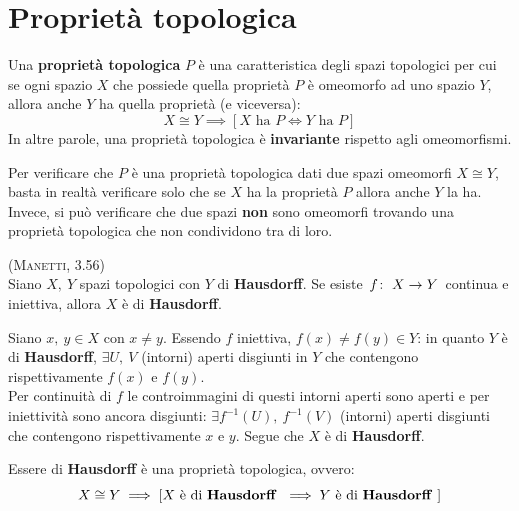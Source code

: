 \section{Proprietà topologica}
\begin{define}
	Una \textbf{proprietà topologica} $P$ è una caratteristica degli spazi topologici per cui se ogni spazio $X$ che possiede quella proprietà $P$ è omeomorfo ad uno spazio $Y$, allora anche $Y$ ha quella proprietà (e viceversa):
	\begin{equation}
		X\cong Y\implies \left[ X\text{ ha }P\iff Y\text{ ha }P\right]
	\end{equation}
	In altre parole, una proprietà topologica è \textbf{invariante} rispetto agli omeomorfismi.
\end{define}
\begin{observe}
	Per verificare che $P$ è una proprietà topologica dati due spazi omeomorfi $X\cong Y$, basta in realtà verificare solo che se $X$ ha la proprietà $P$ allora anche $Y$ la ha.\\
	Invece, si può verificare che due spazi \textbf{non} sono omeomorfi trovando una proprietà topologica che non condividono tra di loro.
\end{observe}
\begin{exercise}\label{hausexercise}\textsc{(Manetti, 3.56)}\\
	Siano $X,\ Y$ spazi topologici con $Y$ di \textbf{Hausdorff}. Se esiste $\funz{f}{X}{Y}$ continua e iniettiva, allora $X$ è di \textbf{Hausdorff}.
\end{exercise}
\begin{demonstration}
	Siano $x,\ y\in X$ con $x\neq y$. Essendo $f$ iniettiva, $f\left(x\right)\neq f\left(y\right)\in Y$: in quanto $Y$ è di \textbf{Hausdorff}, $\exists U,\ V$ (intorni) aperti disgiunti in $Y$ che contengono rispettivamente $f\left(x\right)$ e $f\left(y\right)$.\\
	Per continuità di $f$ le controimmagini di questi intorni aperti sono aperti e per iniettività sono ancora disgiunti: $\exists f^{-1}\left(U\right),\ f^{-1}\left(V\right)$ (intorni) aperti disgiunti che contengono rispettivamente $x$ e $y$. Segue che $X$ è di \textbf{Hausdorff}.
\end{demonstration}
\begin{proposition}
	Essere di \textbf{Hausdorff} è una proprietà topologica, ovvero:
	\begin{equation}
		X\cong Y\implies \left[ X\text{ è di \textbf{Hausdorff} }\implies Y\text{ è di \textbf{Hausdorff} }\right]
	\end{equation}
	\vspace{-8mm}
\end{proposition}
